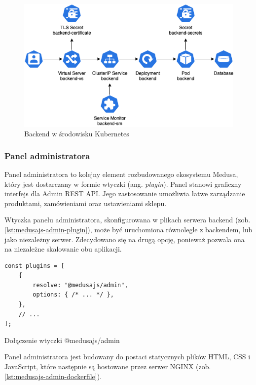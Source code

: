 \begin{figure}[H]
    \centering
    \includegraphics[width=\textwidth]{img/kubernetes-backend}
    \caption{Backend w środowisku Kubernetes}
    \label{fig:kubernetes-backend}
\end{figure}

\subsubsection{Panel administratora}

Panel administratora to kolejny element rozbudowanego ekosystemu Medusa, który jest dostarczany w formie wtyczki (ang. \emph{plugin}).
Panel stanowi graficzny interfejs dla Admin REST API. Jego zastosowanie umożliwia łatwe zarządzanie produktami, zamówieniami oraz ustawieniami sklepu.

Wtyczka panelu administratora, skonfigurowana w plikach serwera backend (zob. \autoref{lst:medusajs-admin-plugin}), może być uruchomiona równolegle z backendem, lub jako niezależny serwer.
Zdecydowano się na drugą opcję, ponieważ pozwala ona na niezależne skalowanie obu aplikacji.

\begin{listing}[H]
    \begin{verbatim}
const plugins = [
    {
        resolve: "@medusajs/admin",
        options: { /* ... */ },
    },
    // ...
];
    \end{verbatim}
    \caption{Dołączenie wtyczki @medusajs/admin}
    \label{lst:medusajs-admin-plugin}
\end{listing}

Panel administratora jest budowany do postaci statycznych plików HTML, CSS i JavaScript, które następnie są hostowane przez serwer NGINX (zob. \autoref{lst:medusajs-admin-dockerfile}).


